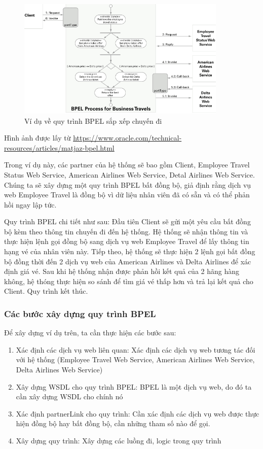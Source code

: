 \begin{figure}[!htp]
	\begin{center}
		\includegraphics[width=10cm]{img/theory/BPEL/Sample.png}
	\end{center}
	\caption{Ví dụ về quy trình BPEL sắp xếp chuyến đi}
\end{figure}

\begin{flushleft}
	Hình ảnh được lấy từ \url{https://www.oracle.com/technical-resources/articles/matjaz-bpel.html}
\end{flushleft}

Trong ví dụ này, các partner của hệ thống sẽ bao gồm Client, Employee Travel Status Web Service, American Airlines Web Service, Detal Airlines Web Service. Chúng ta sẽ xây dựng một quy trình BPEL bất đồng bộ, giả định rằng dịch vụ web Employee Travel là đồng bộ vì dữ liệu nhân viên đã có sẵn và có thể phản hồi ngay lập tức. 

Quy trình BPEL chi tiết như sau: Đầu tiên Client sẽ gửi một yêu cầu bất đồng bộ kèm theo thông tin chuyến đi đến hệ thống. Hệ thống sẽ nhận thông tin và thực hiện lệnh gọi đồng bộ sang dịch vụ web Employee Travel để lấy thông tin hạng vé của nhân viên này. Tiếp theo, hệ thống sẽ thực hiện 2 lệnh gọi bất đồng bộ đồng thời đến 2 dịch vụ web của American Airlines và Delta Airlines để xác định giá vé. Sau khi hệ thống nhận được phản hồi kết quả của 2 hãng hàng không, hệ thóng thực hiện so sánh để tìm giá vé thấp hơn và trả lại kết quả cho Client. Quy trình kết thúc. 

\subsubsection{Các bước xây dựng quy trình BPEL}
Để xây dựng ví dụ trên, ta cần thực hiện các bước sau:
\begin{enumerate}
	\item Xác định các dịch vụ web liên quan: Xác định các dịch vụ web tương tác đối với hệ thống (Employee Travel Web Service, American Airlines Web Service, Delta Airlines Web Service)
	\item Xây dựng WSDL cho quy trình BPEL: BPEL là một dịch vụ web, do đó ta cần xây dựng WSDL cho chính nó
	\item Xác định partnerLink cho quy trình: Cần xác định các dịch vụ web được thực hiện đồng bộ hay bất đồng bộ, cần những tham số nào để gọi.
	\item Xây dựng quy trình: Xây dựng các luồng đi, logic trong quy trình
\end{enumerate} 


